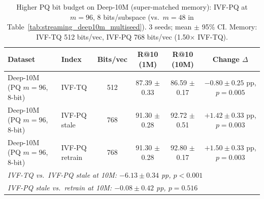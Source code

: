 \begin{table}[t]
\caption{Higher PQ bit budget on Deep-10M (super-matched memory): IVF-PQ at $m{=}96$, 8 bits/subspace (vs.\ $m{=}48$ in Table~\ref{tab:streaming_deep10m_multiseed}). 3 seeds; mean $\pm$ 95\% CI. Memory: IVF-TQ 512 bits/vec, IVF-PQ 768 bits/vec (1.50$\times$ IVF-TQ).}
\label{tab:streaming_deep10m_pqhigh}
\centering\small
\begin{tabular}{llcccc}
\toprule
Dataset & Index & Bits/vec & R@10 (1M) & R@10 (10M) & Change $\Delta$ \\
\midrule
  Deep-10M (PQ $m{=}96$, 8-bit) & IVF-TQ & 512 & 87.39 $\pm$ 0.33 & 86.59 $\pm$ 0.17 & $-0.80 \pm 0.25$ pp, $p=0.005$ \\
  Deep-10M (PQ $m{=}96$, 8-bit) & IVF-PQ stale & 768 & 91.30 $\pm$ 0.28 & 92.72 $\pm$ 0.51 & $+1.42 \pm 0.33$ pp, $p=0.003$ \\
  Deep-10M (PQ $m{=}96$, 8-bit) & IVF-PQ retrain & 768 & 91.30 $\pm$ 0.28 & 92.80 $\pm$ 0.17 & $+1.50 \pm 0.33$ pp, $p=0.003$ \\
\midrule
\multicolumn{6}{l}{\textit{IVF-TQ vs.\ IVF-PQ stale at 10M: $-6.13 \pm 0.34$ pp, $p<0.001$}} \\
\multicolumn{6}{l}{\textit{IVF-PQ stale vs.\ retrain at 10M: $-0.08 \pm 0.42$ pp, $p=0.516$}} \\
\bottomrule
\end{tabular}
\end{table}

